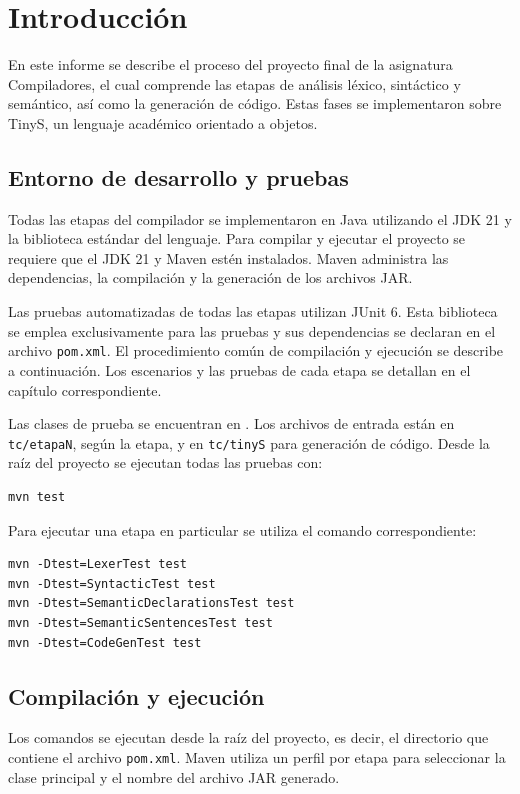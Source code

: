 \chapter{Introducción}
En este informe se describe el proceso del proyecto final de la asignatura Compiladores, el cual comprende las etapas de análisis léxico, sintáctico y semántico, así como la generación de código. Estas fases se implementaron sobre TinyS, un lenguaje académico orientado a objetos.

\section{Entorno de desarrollo y pruebas}
Todas las etapas del compilador se implementaron en Java utilizando el
JDK 21 y la biblioteca estándar del lenguaje. Para compilar y ejecutar el
proyecto se requiere que el JDK 21 y Maven estén instalados. Maven administra las dependencias, la compilación y la
generación de los archivos JAR.

Las pruebas automatizadas de todas las etapas utilizan JUnit 6. Esta
biblioteca se emplea exclusivamente para las pruebas y sus dependencias
se declaran en el archivo \texttt{pom.xml}. El procedimiento común de
compilación y ejecución se describe a continuación. Los escenarios y las
pruebas de cada etapa se detallan en el capítulo correspondiente.

Las clases de prueba se encuentran en
. Los archivos de entrada están
en \texttt{tc/etapaN}, según la etapa, y en
\texttt{tc/tinyS} para generación de código.
Desde la raíz del proyecto se ejecutan todas las pruebas con:
\begin{verbatim}
mvn test
\end{verbatim}
Para ejecutar una etapa en particular se utiliza el comando correspondiente:
\begin{verbatim}
mvn -Dtest=LexerTest test
mvn -Dtest=SyntacticTest test
mvn -Dtest=SemanticDeclarationsTest test
mvn -Dtest=SemanticSentencesTest test
mvn -Dtest=CodeGenTest test
\end{verbatim}

\section{Compilación y ejecución}
\label{sec:compilacion-ejecucion}
Los comandos se ejecutan desde la raíz del proyecto, es decir, el directorio
que contiene el archivo \texttt{pom.xml}. Maven utiliza un perfil por etapa
para seleccionar la clase principal y el nombre del archivo JAR generado.

